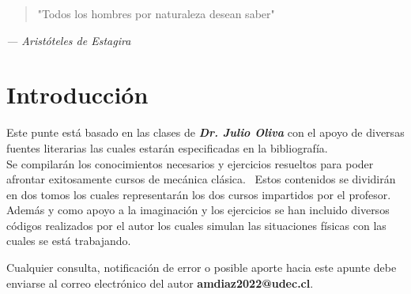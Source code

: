 \documentclass[../main.tex]{subfiles}
\begin{document}
\thispagestyle{empty}

\vspace*{\fill}  %
\begin{center}
    \begin{quote}
        "Todos los hombres por naturaleza desean saber"
    \end{quote}
    \vspace{1cm}  %
    \textit{— Aristóteles de Estagira}  %
\end{center}

\vspace*{\fill}  %
\newpage

\chapter*{Introducción}

Este punte está basado en las clases de \textbf{\emph{Dr. Julio Oliva}} con el apoyo de diversas fuentes literarias las cuales estarán especificadas en la bibliografía. \\
Se compilarán los conocimientos necesarios y ejercicios resueltos para poder afrontar exitosamente cursos de mecánica clásica.  \
Estos contenidos se dividirán en dos tomos los cuales representarán los dos cursos impartidos por el profesor. \\
Además y como apoyo a la imaginación y los ejercicios se han incluido diversos códigos realizados por el autor los cuales simulan las situaciones físicas con las cuales se está trabajando.

\medskip

Cualquier consulta, notificación de error o posible aporte hacia este apunte debe enviarse al correo electrónico del autor \textbf{amdiaz2022@udec.cl}.
\end{document}
